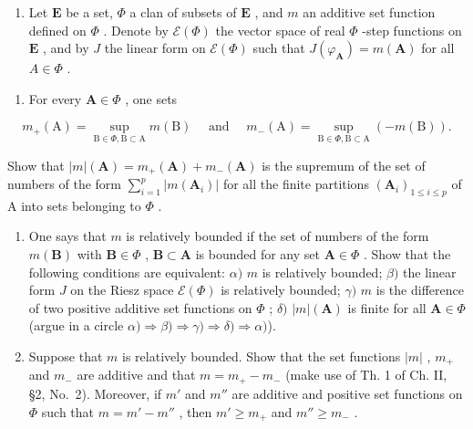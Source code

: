 \exercisesection{}

\begin{enumerate}
\def\labelenumi{\arabic{enumi})}
\tightlist
\item
  Let \(\mathbf{E}\) be a set, \(\Phi\) a clan of subsets of \(\mathbf{E}\) , and \(m\) an additive set function defined on \(\Phi\) . Denote by \(\mathcal{E}(\Phi)\) the vector space of real \(\Phi\) -step functions on \(\mathbf{E}\) , and by \(J\) the linear form on \(\mathcal{E}(\Phi)\) such that \(J(\varphi_{\mathbf{A}}) = m(\mathbf{A})\) for all \(A \in \Phi\) .
\end{enumerate}

\begin{enumerate}
\def\labelenumi{\alph{enumi})}
\tightlist
\item
  For every \(\mathbf{A} \in \Phi\) , one sets
\end{enumerate}

\[
m _ {+} (\mathrm{A}) = \sup _ {\mathrm{B} \in \Phi , \mathrm{B} \subset \mathrm{A}} m (\mathrm{B}) \quad \text { and } \quad m _ {-} (\mathrm{A}) = \sup _ {\mathrm{B} \in \Phi , \mathrm{B} \subset \mathrm{A}} (- m (\mathrm{B})).
\]

Show that \(|m|(\mathbf{A}) = m_{+}(\mathbf{A}) + m_{-}(\mathbf{A})\) is the supremum of the set of numbers of the form \(\sum_{i=1}^{p}|m(\mathbf{A}_i)|\) for all the finite partitions \((\mathbf{A}_i)_{1\leqslant i\leqslant p}\) of A into sets belonging to \(\Phi\) .

\begin{enumerate}
\def\labelenumi{\alph{enumi})}
\setcounter{enumi}{1}
\item
  One says that \(m\) is relatively bounded if the set of numbers of the form \(m(\mathbf{B})\) with \(\mathbf{B} \in \Phi\) , \(\mathbf{B} \subset \mathbf{A}\) is bounded for any set \(\mathbf{A} \in \Phi\) . Show that the following conditions are equivalent: \(\alpha)\) \(m\) is relatively bounded; \(\beta)\) the linear form \(J\) on the Riesz space \(\mathcal{E}(\Phi)\) is relatively bounded; \(\gamma)\) \(m\) is the difference of two positive additive set functions on \(\Phi\) ; \(\delta)\) \(|m|(\mathbf{A})\) is finite for all \(\mathbf{A} \in \Phi\) (argue in a circle \(\alpha) \Rightarrow \beta) \Rightarrow \gamma) \Rightarrow \delta) \Rightarrow \alpha)\)).
\item
  Suppose that \(m\) is relatively bounded. Show that the set functions \(|m|\) , \(m_{+}\) and \(m_{-}\) are additive and that \(m = m_{+} - m_{-}\) (make use of Th. 1 of Ch. II, §2, No.~2). Moreover, if \(m'\) and \(m''\) are additive and positive set functions on \(\Phi\) such that \(m = m' - m''\) , then \(m' \geqslant m_{+}\) and \(m'' \geqslant m_{-}\) .
\end{enumerate}

